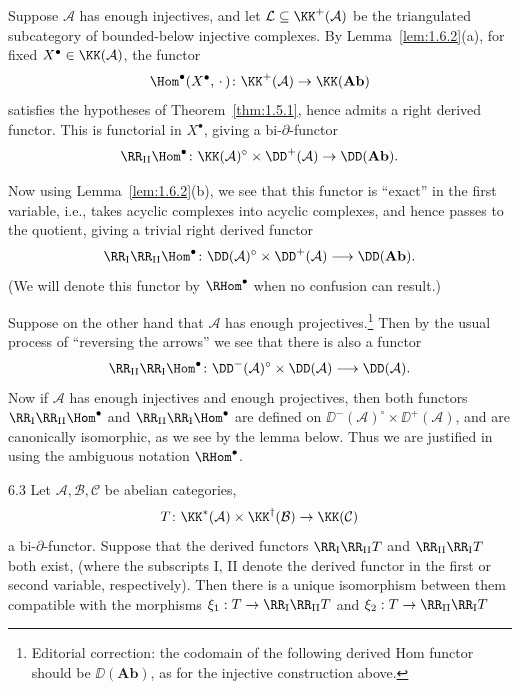Suppose $\mathcal{A}$ has enough injectives, and let $\mathcal{L}\subseteq\KK^+(\mathcal{A})$ be the triangulated
subcategory of bounded-below injective complexes.
By Lemma~\ref{lem:1.6.2}(a), for fixed $X^\bullet\in\KK(\mathcal{A})$, the functor
\[
\Hom^\bullet(X^\bullet,\,\cdot\,)\colon\KK^+(\mathcal{A})\to\KK(\mathbf{Ab})
\]
satisfies the hypotheses of Theorem~\ref{thm:1.5.1}, hence admits a right derived functor.
This is functorial in $X^\bullet$, giving a bi-$\partial$-functor
\[
\RR_\mathrm{II}\Hom^\bullet
\colon\KK(\mathcal{A})^\circ \times \DD^+(\mathcal{A}) \to \DD(\mathbf{Ab}).
\]

Now using Lemma~\ref{lem:1.6.2}(b), we see that this functor is ``exact'' in the first variable, i.e., takes acyclic complexes into acyclic complexes, and hence passes to the quotient, giving a trivial right derived functor
\[
\RR_{\mathrm{I}}\RR_{\mathrm{II}}\Hom^\bullet\colon
\DD(\mathcal{A})^\circ\times\DD^+(\mathcal{A})\longrightarrow\DD(\mathbf{Ab}).
\]
(We will denote this functor by $\RHom^\bullet$ when no confusion can result.)

Suppose on the other hand that $\mathcal{A}$ has enough projectives.\footnote{Editorial correction: the codomain of the following derived Hom functor should be $\DD(\mathbf{Ab})$, as for the injective construction above.} Then by the usual process of ``reversing the arrows'' we see that there is also a functor
\[
\RR_{\mathrm{II}}\RR_{\mathrm{I}}\Hom^\bullet\colon
\DD^-(\mathcal{A})^\circ\times\DD(\mathcal{A})\longrightarrow\DD(\mathcal{A}).
\]
Now if $\mathcal{A}$ has enough injectives and enough projectives, then both functors $\RR_{\mathrm{I}}\RR_{\mathrm{II}}\Hom^\bullet$ and $\RR_{\mathrm{II}}\RR_{\mathrm{I}}\Hom^\bullet$ are defined on $\DD^-(\mathcal{A})^\circ\times\DD^+(\mathcal{A})$, and are canonically isomorphic, as we see by the lemma below. Thus we are justified in using the ambiguous notation $\RHom^\bullet$.

\begin{booklemma}{6.3}\label{lem:1.6.3}
Let $\mathcal{A},\mathcal{B},\mathcal{C}$ be abelian categories,
\[
T\colon\KK^*(\mathcal{A})\times\KK^\dagger(\mathcal{B})\to\KK(\mathcal{C})
\]
a bi-$\partial$-functor.
Suppose that the derived functors $\RR_\mathrm{I}\RR_\mathrm{II}T$ and $\RR_\mathrm{II}\RR_\mathrm{I}T$ both exist, (where the subscripts $\mathrm{I},\,\mathrm{II}$ denote the derived functor in the first
or second variable, respectively). Then there is a unique isomorphism
between them compatible with the morphisms $\xi_1:T\rightarrow\RR_\mathrm{I}\RR_\mathrm{II}T$ and $\xi_2:T\rightarrow\RR_\mathrm{II}\RR_\mathrm{I}T$
\end{booklemma}

